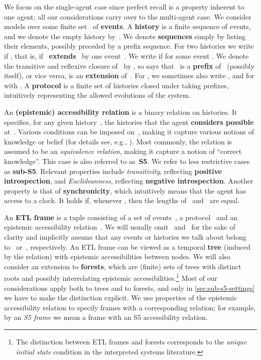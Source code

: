 \documentclass{article}
\def\dfn{\textbf}
\newcounter{#1}
\begin{document}
We focus on the single-agent case since perfect recall is a property inherent to one agent;
all our considerations carry over to the multi-agent case.
We consider models over some finite set~ of \dfn{events}.
A \dfn{history}  is a finite sequence of events,
and we denote the empty history by~.
We denote \dfn{sequences} simply by listing their elements,
possibly preceded by a prefix sequence.
For two histories  we write  if ,
that is, if~ \dfn{extends}~ by one event~.
We write  if  for some event .
We denote the transitive and reflexive closure of~ by ,
so  says that~ is a \dfn{prefix} of~ (possibly  itself),
or vice versa,  is an \dfn{extension} of~.
For , we sometimes also write ,
and  for  with .
A \dfn{protocol}  is a finite set of histories closed under taking prefixes,
intuitively representing the allowed evolutions of the system.

An \dfn{(epistemic) accessibility relation} is a binary relation  on histories.
It specifies, for any given history~,
the histories that the agent \dfn{considers possible} at~.
Various conditions can be imposed on~,
making it capture various notions of knowledge or belief
(for details see, e.g., \cite{chellas_modal_1980}).
Most commonly, the relation is assumed to be an \emph{equivalence relation},
making it capture a notion of ``correct knowledge''.
This case is also referred to as~\dfn{S5}.
We refer to less restrictive cases as \dfn{sub-S5}.
Relevant properties include \emph{transitivity},
reflecting \dfn{positive introspection},
and \emph{Euclideanness},
reflecting \dfn{negative introspection}.
Another property is that of \dfn{synchronicity},
which intuitively means that the agent has access to a clock.
It holds if, whenever , then the lengths of~ and~ are equal.

An \dfn{ETL frame} is a tuple  consisting of
a set of events~, a protocol~ and an epistemic accessibility relation~.
We will usually omit~ and~ for the sake of clarity and implicitly assume that
any events or histories we talk about belong to~ or~, respectively.
An ETL frame can be viewed as a temporal \dfn{tree} (induced by the  relation)
with epistemic accessibilities between nodes.
We will also consider an extension to \dfn{forests},
which are (finite) sets of trees with distinct roots and possibly interrelating epistemic accessibilities.\footnote{The distinction between ETL frames and forests corresponds
  to the \emph{unique initial state} condition in the interpreted systems literature.}
Most of our considerations apply both to trees and to forests,
and only in \cref{sec:sub-s5-settings} we have to make the distinction explicit.
We use properties of the epistemic accessibility relation to specify frames with a corresponding relation;
for example, by an \emph{S5 frame} we mean a frame with an S5 accessibility relation.
\end{document}
